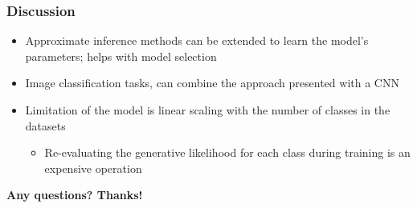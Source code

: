 \documentclass{beamer}
\begin{document}
\begin{frame}
  \frametitle{Discussion}

  \begin{itemize}
  \item Approximate inference methods can be extended to learn the
    model's parameters; helps with model selection
  \item Image classification tasks, can combine the approach presented
    with a CNN
  \item Limitation of the model is linear scaling with the number of
    classes in the datasets
    \begin{itemize}
    \item Re-evaluating the generative likelihood for each class during
      training is an expensive operation
      \end{itemize}
    \end{itemize}

\end{frame}

\begin{frame}
  \textbf{Any questions? Thanks!}
  \end{frame}


 
\end{document}
